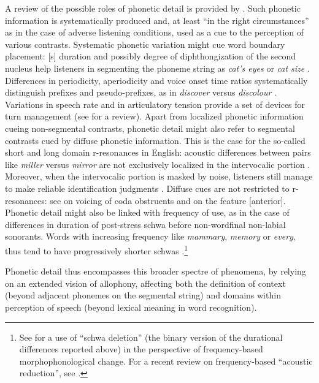 A review of the possible roles of phonetic detail is provided by \citet[§5.1]{hawkins2003roles}. Such phonetic information is systematically produced and, at least ``in the right circumstances'' \citep{hawkins2010phonetic} as in the case of adverse listening conditions, used as a cue to the perception of various contrasts. Systematic phonetic variation might cue word boundary placement: [s] duration and possibly degree of diphthongization of the second nucleus help listeners in segmenting the phoneme string  as \textit{cat's eyes} or \textit{cat size} \citep{hawkins2001polysp}. Differences in periodicity, aperiodicity and voice onset time ratios systematically distinguish prefixes and pseudo-prefixes, as in \textit{discover} versus \textit{discolour} \citep{smith2012phonetic}. Variations in speech rate and in articulatory tension provide a set of devices for turn management (see \citealt{local2003phonetics} for a review). Apart from localized phonetic information cueing non-segmental contrasts, phonetic detail might also refer to segmental contrasts cued by diffuse phonetic information. This is the case for the so-called short and long domain r-resonances in English: acoustic differences between pairs like \textit{miller} versus \textit{mirror} are not exclusively localized in the intervocalic portion \citep{kelly1986long}. Moreover, when the intervocalic portion is masked by noise, listeners still manage to make reliable identification judgments \citep{west1999perception,heinrich2010influence}. Diffuse cues are not restricted to r-resonances: see \citet{hawkins2004influence} on voicing of coda obstruents and \citet{coleman2003discovering} on the feature [anterior]. Phonetic detail might also be linked with frequency of use, as in the case of differences in duration of post-stress schwa before non-wordfinal non-labial sonorants. Words with increasing frequency like \textit{mammary}, \textit{memory} or \textit{every}, thus tend to have progressively shorter schwas \citep{bybee2001phonology}.\footnote{See \citet{hooper1976word} for a use of ``schwa deletion'' (the binary version of the durational differences reported above) in the perspective of frequency-based morphophonological change. For a recent review on frequency-based ``acoustic reduction'', see \citet{ernestusacoustic}.}

Phonetic detail thus encompasses this broader spectre of phenomena, by relying on an extended vision of allophony, affecting both the definition of context (beyond adjacent phonemes on the segmental string) and domains within perception of speech (beyond lexical meaning in word recognition).

